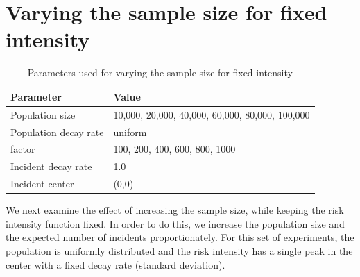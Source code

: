 \section{Varying the sample size for fixed intensity}
\label{sec:results:unifNpop_1h}

\begin{table}[htbp]
\centering
\begin{tabular}{ll}
\hline
Parameter & Value \\
\hline
Population size & 10,000, 20,000, 40,000, 60,000, 80,000, 100,000 \\
Population decay rate & uniform \\
\Gls{factor} & 100, 200, 400, 600, 800, 1000 \\
Incident decay rate & 1.0 \\
Incident center & (0,0) \\
\hline
\end{tabular}
\caption{Parameters used for varying the sample size for fixed intensity}
\label{tab:params:unifNpop_1h}
\end{table}


We next examine the effect of increasing the sample size, while keeping the risk intensity function fixed.
In order to do this, we increase the population size and the expected number of incidents proportionately.
For this set of experiments, the population is uniformly distributed and the risk intensity has a single peak in the center with a fixed decay rate (standard deviation).

